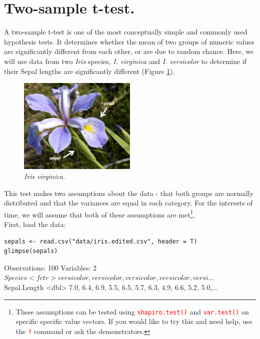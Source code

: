 \documentclass[a4paper,12pt]{article}
\newcommand\code[1]{\textcolor{red}{\texttt{#1}}}
\begin{document}
\section{Two-sample t-test.}

A two-sample t-test is one of the most conceptually simple and commonly used hypothesis tests. It determines whether the mean of two groups of numeric values are significantly different from each other, or are due to random chance. Here, we will use data from two \textit{Iris} species, \textit{I. virginica} and \textit{I. versicolor} to determine if their Sepal lengths are significantly different (Figure \ref{fig:IrisVirginica}). \\

\begin{figure}[h]
\centering 
\includegraphics[width=0.5\textwidth]{figs/Irisvirginica.jpg}
\caption{\textit{Iris virginica.}}
\label{fig:IrisVirginica}
\end{figure} 

This test makes two assumptions about the data - that both groups are normally distributed and that the variances are equal in each category. For the interests of time, we will assume that both of these assumptions are met\footnote{These assumptions can be tested using \code{shapiro.test()} and \code{var.test()} on specific specific value vectors. If you would like to try this and need help, use the \code{?} command or ask the demonstrators.}.\\

First, load the data:

\begin{shaded}
\begin{verbatim}
sepals <- read.csv("data/iris.edited.csv", header = T)
glimpse(sepals)
\end{verbatim}


\begin{Schunk}
\begin{Soutput}
Observations: 100
Variables: 2
$ Species      <fctr> versicolor, versicolor, versicolor, versicolor, versi...
$ Sepal.Length <dbl> 7.0, 6.4, 6.9, 5.5, 6.5, 5.7, 6.3, 4.9, 6.6, 5.2, 5.0,...
\end{Soutput}
\end{Schunk}
\end{shaded}
\end{document}
